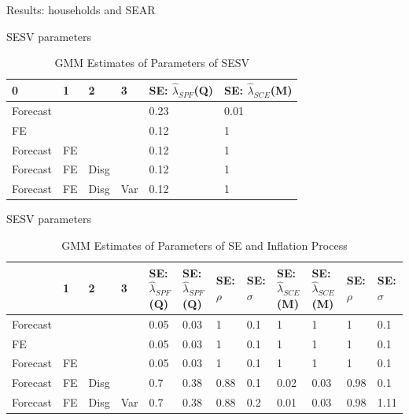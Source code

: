 \documentclass{beamer}
\begin{document}
\begin{frame}{Results: households and SEAR}
	\begin{frame}{SESV parameters}
		\begin{table}
			\centering
			\caption{GMM Estimates of Parameters of SESV}
			\label{GMM_Est_SE_SV_Table}
			\begin{tabular}{llllll}
				\hline 
				0        & 1  & 2    & 3   & SE: $\hat\lambda_{SPF}$(Q) & SE: $\hat\lambda_{SCE}$(M) \\
				\hline 
				Forecast &    &      &     & 0.23                       & 0.01                       \\
				FE       &    &      &     & 0.12                       & 1                          \\
				Forecast & FE &      &     & 0.12                       & 1                          \\
				Forecast & FE & Disg &     & 0.12                       & 1                          \\
				Forecast & FE & Disg & Var & 0.12                       & 1           \\
				\hline               
			\end{tabular}
		\end{table}	
	\end{frame}
	
	\begin{frame}{SESV parameters}
		\begin{table}
			\centering
			\caption{GMM Estimates of Parameters of SE and Inflation Process}
			\label{GMM_Est_SE_Table}
			\begin{tabular}{llllllllllll}
				\hline 
				& 1  & 2    & 3   & SE: $\hat\lambda_{SPF}$(Q) & SE: $\hat\lambda_{SPF}$(Q) & SE: $\rho$ & SE: $\sigma$ & SE: $\hat\lambda_{SCE}$(M) & SE: $\hat\lambda_{SCE}$(M) & SE: $\rho$ & SE: $\sigma$ \\
				\hline 
				Forecast &    &      &     & 0.05                       & 0.03                       & 1          & 0.1          & 1                          & 1                          & 1          & 0.1          \\
				FE       &    &      &     & 0.05                       & 0.03                       & 1          & 0.1          & 1                          & 1                          & 1          & 0.1          \\
				Forecast & FE &      &     & 0.05                       & 0.03                       & 1          & 0.1          & 1                          & 1                          & 1          & 0.1          \\
				Forecast & FE & Disg &     & 0.7                        & 0.38                       & 0.88       & 0.1          & 0.02                       & 0.03                       & 0.98       & 0.1          \\
				Forecast & FE & Disg & Var & 0.7                        & 0.38                       & 0.88       & 0.2          & 0.01                       & 0.03                       & 0.98       & 1.11     \\
				\hline    
			\end{tabular}
		\end{table}
\end{frame}


\end{frame}
\end{document}
